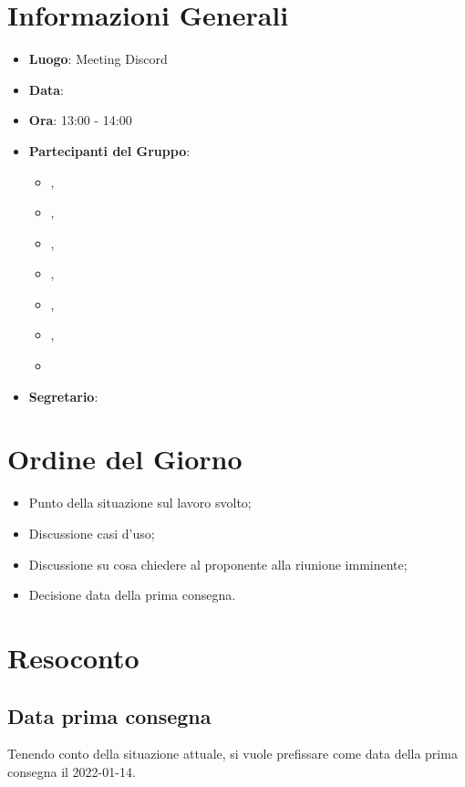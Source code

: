 \section{Informazioni Generali}

\begin{itemize}
\item{\textbf{Luogo}}: Meeting Discord
\item{\textbf{Data}}: \D{}
\item{\textbf{Ora}}: 13:00 - 14:00
\item{\textbf{Partecipanti del Gruppo}}: 
	\begin{itemize}
	\item{\EP{},} 
	\item{\FP{},}
	\item{\GC{},}
	\item{\LW{},}
	\item{\MB{},}
	\item{\MG{},}
	\item{\PV{}}
	\end{itemize} 
\item{\textbf{Segretario}}: \PV{}	
\end{itemize}

\section{Ordine del Giorno}
\begin{itemize}
\item{Punto della situazione sul lavoro svolto;}
\item{Discussione casi d'uso;}
\item{Discussione su cosa chiedere al proponente alla riunione imminente;}
\item{Decisione data della prima consegna.}
\end{itemize}

\section{Resoconto}

\subsection{Data prima consegna}
Tenendo conto della situazione attuale, si vuole prefissare come data della prima consegna il 2022-01-14.